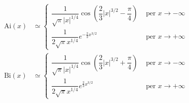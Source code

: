 \documentclass[11 pt]{article}
\newcommand{\ai}{\mathrm{Ai}}
\newcommand{\bi}{\mathrm{Bi}}
\begin{document}
	\begin{align*}
		\ai(x)&\simeq\begin{cases}\dfrac{1}{\sqrt{\pi}|x|^{1/4}}\cos\left(\dfrac{2}{3}|x|^{3/2}-\dfrac{\pi}{4}\right)&\textrm{ per }x\to-\infty\\[10pt]\dfrac{1}{2\sqrt{\pi}x^{1/4}}e^{-\frac{2}{3}x^{3/2}}&\textrm{ per }x\to+\infty
		\end{cases}\\
		\bi(x)&\simeq\begin{cases}\dfrac{1}{\sqrt{\pi}|x|^{1/4}}\cos\left(\dfrac{2}{3}|x|^{3/2}+\dfrac{\pi}{4}\right)&\textrm{ per }x\to-\infty\\[10pt]\dfrac{1}{2\sqrt{\pi}x^{1/4}}e^{\frac{2}{3}x^{3/2}}&\textrm{ per }x\to+\infty
		\end{cases}
	\end{align*}
\end{document}
